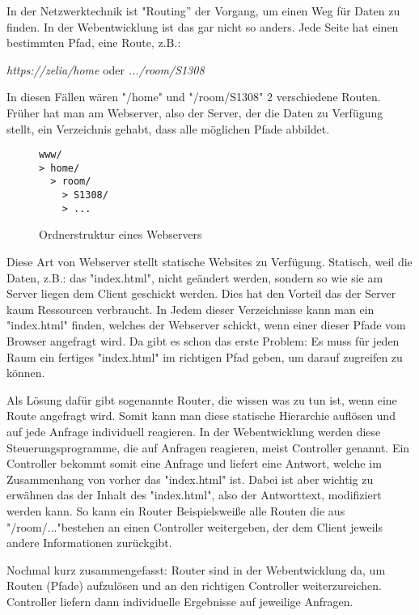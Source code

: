 


In der Netzwerktechnik ist "Routing” der Vorgang, um einen Weg für Daten zu finden. In der Webentwicklung ist das gar nicht so anders. Jede Seite hat einen bestimmten Pfad, eine Route, z.B.:

\emph{https://zelia/home} oder \emph{.../room/S1308}

In diesen Fällen wären "/home" und "/room/S1308" 2 verschiedene Routen. Früher hat man am Webserver, also der Server, der die Daten zu Verfügung stellt, ein Verzeichnis gehabt, dass alle möglichen Pfade abbildet.

\begin{figure}[h]
    \begin{lstlisting}
www/
> home/
  > room/
    > S1308/
    > ...
    \end{lstlisting}
    \caption{Ordnerstruktur eines Webservers}
\end{figure}

Diese Art von Webserver stellt statische Websites zu Verfügung. Statisch, weil die Daten, z.B.: das "index.html", nicht geändert werden, sondern so wie sie am Server liegen dem Client geschickt werden. Dies hat den Vorteil das der Server kaum Ressourcen verbraucht. In Jedem dieser Verzeichnisse kann man ein "index.html" finden, welches der Webserver schickt, wenn einer dieser Pfade vom Browser angefragt wird. Da gibt es schon das erste Problem: Es muss für jeden Raum ein fertiges "index.html" im richtigen Pfad geben, um darauf zugreifen zu können.

Als Lösung dafür gibt sogenannte Router, die wissen was zu tun ist, wenn eine Route angefragt wird. Somit kann man diese statische Hierarchie auflösen und auf jede Anfrage individuell reagieren. In der Webentwicklung werden diese Steuerungsprogramme, die auf Anfragen reagieren, meist Controller genannt. Ein Controller bekommt somit eine Anfrage und liefert eine Antwort, welche im Zusammenhang von vorher das "index.html" ist. Dabei ist aber wichtig zu erwähnen das der Inhalt des "index.html", also der Antworttext, modifiziert werden kann. So kann ein Router Beispielsweiße alle Routen die aus "/room/..."bestehen an einen Controller weitergeben, der dem Client jeweils andere Informationen zurückgibt.

Nochmal kurz zusammengefasst: Router sind in der Webentwicklung da, um Routen (Pfade) aufzulösen und an den richtigen Controller weiterzureichen. Controller liefern dann individuelle Ergebnisse auf jeweilige Anfragen.

